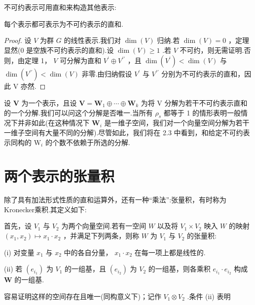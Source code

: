 不可约表示可用直和来构造其他表示:
\begin{theorem}[]
    每个表示都可表示为不可约表示的直和.
\end{theorem}
\begin{proof}
    设 \(V\) 为群 \(G\) 的线性表示.我们对 \(\dim \left( V\right)\) 归纳.若 \(\dim \left( V\right)  = 0\) ，定理显然(0 是空族不可约表示的直和).设 \(\dim \left( V\right)  \geq  1\) .若 \(V\) 不可约，则无需证明.否则，由定理 1， \(V\) 可分解为直和 \({V}^{\prime } \oplus  {V}^{\prime \prime }\) ，且 \(\dim \left( {V}^{\prime }\right)  < \dim \left( V\right)\) 与 \(\dim \left( {V}^{\prime \prime }\right)  < \dim \left( V\right)\) 非零.由归纳假设 \({V}^{\prime }\) 与 \({V}^{\prime \prime }\) 分别为不可约表示的直和，因此 V 亦然.
\end{proof}
\begin{remark}
设 \(\mathbf{V}\) 为一个表示，且设 \(\mathbf{V} = {\mathbf{W}}_{1} \oplus  \cdots  \oplus  {\mathbf{W}}_{k}\) 为将 \(\mathrm{V}\) 分解为若干不可约表示直和的一个分解.我们可以问这个分解是否唯一.当所有 \({\rho }_{s}\) 都等于 1 的情形表明一般情况下并非如此(在这种情况下 \({\mathbf{W}}_{i}\) 是一维子空间，我们对一个向量空间分解为若干一维子空间有大量不同的分解).尽管如此，我们将在 2.3 中看到，和给定不可约表示同构的 \({\mathrm{W}}_{i}\) 的个数不依赖于所选的分解.
\end{remark}

\section{两个表示的张量积}

除了具有加法形式性质的直和运算外，还有一种“乘法”:张量积，有时称为Kronecker乘积.其定义如下:

首先，设 \({V}_{1}\) 与 \({V}_{2}\) 为两个向量空间.若有一空间 \(W\) 以及将 \({V}_{1} \times  {V}_{2}\) 映入 \(W\) 的映射 \(\left( {{x}_{1},{x}_{2}}\right)  \mapsto  {x}_{1} \cdot  {x}_{2}\) ，并满足下列两条，则称 \(W\) 为 \({V}_{1}\) 与 \({V}_{2}\) 的张量积:

(i) 对变量 \({x}_{1}\) 与 \({x}_{2}\) 中的各自分量， \({x}_{1} \cdot  {x}_{2}\) 在每一项上都是线性的.

(ii) 若 \(\left( {e}_{{i}_{1}}\right)\) 为 \({V}_{1}\) 的一组基，且 \(\left( {e}_{{i}_{2}}\right)\) 为 \({V}_{2}\) 的一组基，则各乘积 \({e}_{{i}_{1}} \cdot  {e}_{{i}_{2}}\) 构成 \(\mathbf{W}\) 的一组基.

容易证明这样的空间存在且唯一(同构意义下)；记作 \({V}_{1} \otimes  {V}_{2}\) .条件 (ii) 表明

